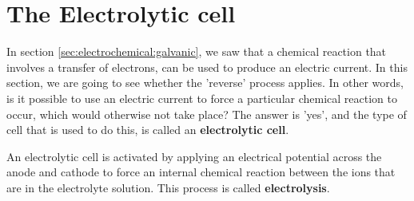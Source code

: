 



\section{The Electrolytic cell}
\label{sec:electrochemical:electrolytic}

In section \ref{sec:electrochemical:galvanic}, we saw that a chemical reaction that involves a transfer of electrons, can be used to produce an electric current. In this section, we are going to see whether the 'reverse' process applies. In other words, is it possible to use an electric current to force a particular chemical reaction to occur, which would otherwise not take place? The answer is 'yes', and the type of cell that is used to do this, is called an \textbf{electrolytic cell}.


An electrolytic cell is activated by applying an electrical potential across the anode and cathode to force an internal chemical reaction between the ions that are in the electrolyte solution. This process is called \textbf{electrolysis}.


